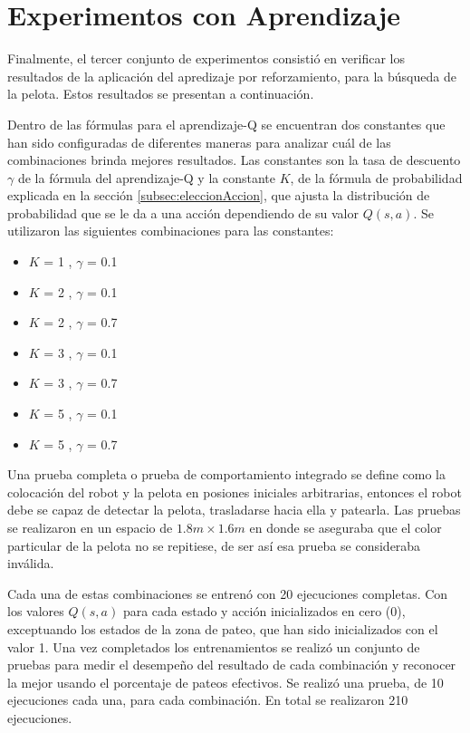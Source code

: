 \section{Experimentos con Aprendizaje}\label{sec:experimentosAprend}

Finalmente, el tercer conjunto de experimentos consistió en verificar los resultados de la aplicaci\'on del apredizaje por reforzamiento, para la búsqueda de la pelota. Estos resultados se presentan a continuaci\'on.

Dentro de las fórmulas para el aprendizaje-Q se encuentran dos constantes que han sido configuradas de diferentes maneras para analizar cuál de las combinaciones brinda mejores resultados. Las constantes son la tasa de descuento $\gamma$ de la fórmula del aprendizaje-Q y la constante $K$, de la fórmula de probabilidad explicada en la secci\'on \ref{subsec:eleccionAccion}, que ajusta la distribución de probabilidad que se le da a una acción dependiendo de su valor $Q(s,a)$. Se utilizaron las siguientes combinaciones para las constantes:

\begin{itemize}
\item $K$ = 1 , $\gamma$ = 0.1
\item $K$ = 2 , $\gamma$ = 0.1 
\item $K$ = 2 , $\gamma$ = 0.7
\item $K$ = 3 , $\gamma$ = 0.1
\item $K$ = 3 , $\gamma$ = 0.7
\item $K$ = 5 , $\gamma$ = 0.1
\item $K$ = 5 , $\gamma$ = 0.7
   
\end{itemize}

Una prueba completa o prueba de comportamiento integrado se define como la colocaci\'on del robot y la pelota en posiones iniciales arbitrarias, entonces el robot debe se capaz de detectar la pelota, trasladarse hacia ella y patearla. Las pruebas se realizaron en un espacio de $1.8 m \times 1.6 m$
en donde se aseguraba que el color particular de la pelota no se repitiese, de ser así esa prueba se consideraba inválida.

Cada una de estas combinaciones se entrenó con 20 ejecuciones completas. Con los valores $Q(s,a)$ para cada estado y acción inicializados en cero (0), exceptuando los estados de la zona de pateo, que han sido inicializados con el valor 1. Una vez completados los entrenamientos se realizó un conjunto de pruebas para medir el desempeño del resultado de cada combinación y reconocer la mejor usando el porcentaje de pateos efectivos. Se realizó una prueba, de 10 ejecuciones cada una, para cada combinación. En total se realizaron 210 ejecuciones. 

